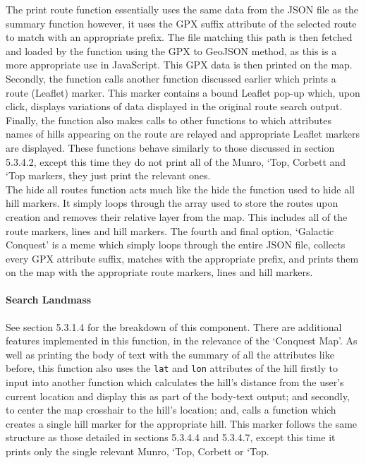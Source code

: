 \documentclass[11pt, english]{article}
\begin{document}
	The print route function essentially uses the same data from the JSON file as the summary function however, it uses the GPX suffix attribute of the selected route to match with an appropriate prefix. The file matching this path is then fetched and loaded by the function using the GPX to GeoJSON method, as this is a more appropriate use in JavaScript. This GPX data is then printed on the map. Secondly, the function calls another function discussed earlier which prints a route (Leaflet) marker. This marker contains a bound Leaflet pop-up which, upon click, displays variations of data displayed in the original route search output. Finally, the function also makes calls to other functions to which attributes names of hills appearing on the route are relayed and appropriate Leaflet markers are displayed. These functions behave similarly to those discussed in section 5.3.4.2, except this time they do not print all of the Munro, `Top, Corbett and `Top markers, they just print the relevant ones.\\

	The hide all routes function acts much like the hide the function used to hide all hill markers. It simply loops through the array used to store the routes upon creation and removes their relative layer from the map. This includes all of the route markers, lines and hill markers. The fourth and final option, `Galactic Conquest' is a meme which simply loops through the entire JSON file, collects every GPX attribute suffix, matches with the appropriate prefix, and prints them on the map with the appropriate route markers, lines and hill markers.

			\paragraph{Search Landmass}	

	See section 5.3.1.4 for the breakdown of this component. There are additional features implemented in this function, in the relevance of the `Conquest Map'. As well as printing the body of text with the summary of all the attributes like before, this function also uses the \texttt{lat} and \texttt{lon} attributes of the hill firstly to input into another function which calculates the hill's distance from the user's current location and display this as part of the body-text output; and secondly, to center the map crosshair to the hill's location; and, calls a function which creates a single hill marker for the appropriate hill. This marker follows the same structure as those detailed in sections 5.3.4.4 and 5.3.4.7, except this time it prints only the single relevant Munro, `Top, Corbett or `Top.
\end{document}
